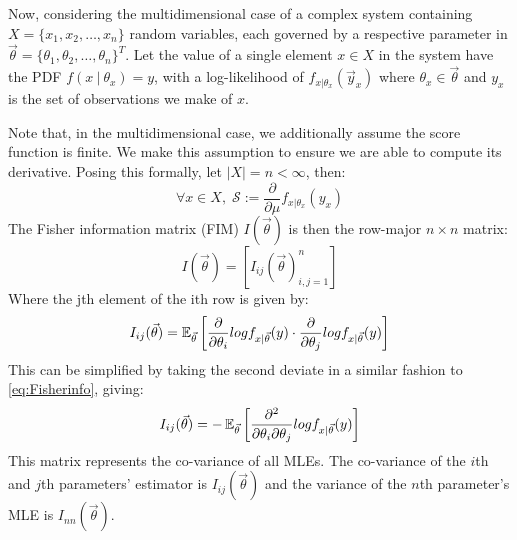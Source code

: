 Now, considering the multidimensional case of a complex system containing $X=\{x_1,x_2,\ldots,x_n\}$ random variables, each governed by a respective parameter in $\vec{\theta}=\{\theta_1,\theta_2,\ldots,\theta_n\}^T$. Let the value of a single element $x\in X$ in the system have the PDF $f(x\ |\ \theta_x) = y$, with a log-likelihood of $f_{x|\theta_x}(\vec{y}_x)$ where $\theta_x\in \vec{\theta}$ and $y_x$ is the set of observations we make of $x$.\par
Note that, in the multidimensional case, we additionally assume the score function is finite. We make this assumption to ensure we are able to compute its derivative. Posing this formally, let $|X| = n < \infty$, then:
\begin{equation*}
    \forall x\in X,\; \mathcal{S}:=\frac{\partial}{\partial\mu} f_{x|\theta_x}(y_x)
\end{equation*}
\noindent The Fisher information matrix (FIM) $I(\vec{\theta})$ is then the row-major $n\times n$ matrix:
\begin{equation*}
    I(\vec{\theta}) = [I_{ij}(\vec{\theta})^{n}_{i,j=1}]
\end{equation*}
Where the jth element of the ith row is given by:
\begin{equation*}
    I_{ij}(\vec{\theta})= \operatorname{\mathbb{E}}_{\vec{\theta}} \left[
    \frac{\partial}{\partial \theta_i} log f_{x|\vec{\theta}}(y) \cdot
    \frac{\partial}{\partial \theta_j} log f_{x|\vec{\theta}}(y) \right]
\end{equation*}
\noindent This can be simplified by taking the second deviate in a similar fashion to \cref{eq:Fisherinfo}, giving:
\begin{equation*}
    I_{ij}(\vec{\theta})= -\operatorname{\mathbb{E}}_{\vec{\theta}}\left[
    \frac{\partial^2}{\partial \theta_i \partial \theta_j} log f_{x|\vec{\theta}}(y)\right]
\end{equation*}
This matrix represents the co-variance of all MLEs. The co-variance of the $i$th and $j$th parameters' estimator is $I_{ij}(\vec{\theta})$ and the variance of the $n$th parameter's MLE is $I_{nn}(\vec{\theta})$.

